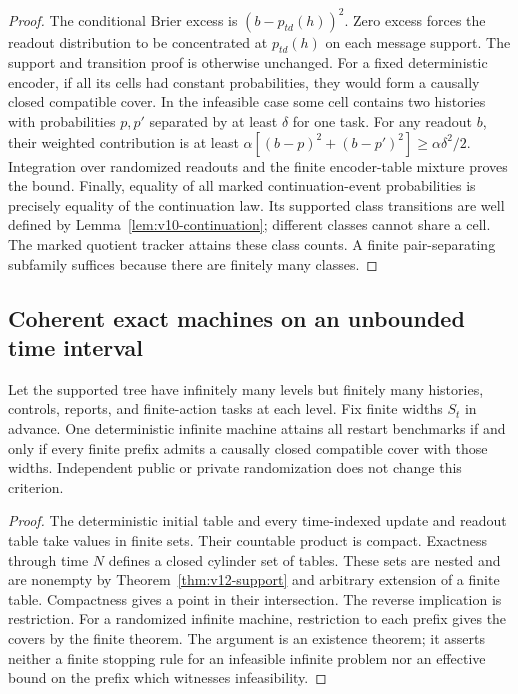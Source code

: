 \begin{proof}
The conditional Brier excess is $(b-p_{td}(h))^2$. Zero excess forces the
readout distribution to be concentrated at $p_{td}(h)$ on each message
support. The support and transition proof is otherwise unchanged. For a
fixed deterministic encoder, if all its cells had constant probabilities,
they would form a causally closed compatible cover. In the infeasible
case some cell contains two histories with probabilities $p,p'$ separated
by at least $\delta$ for one task. For any readout $b$, their weighted
contribution is at least
$\alpha[(b-p)^2+(b-p')^2]\ge\alpha\delta^2/2$.
Integration over randomized readouts and the finite encoder-table mixture
proves the bound. Finally, equality of all marked continuation-event
probabilities is precisely equality of the continuation law. Its
supported class transitions are well defined by
Lemma~\ref{lem:v10-continuation}; different classes cannot share a cell.
The marked quotient tracker attains these class counts. A finite
pair-separating subfamily suffices because there are finitely many classes.
\end{proof}

\subsection{Coherent exact machines on an unbounded time interval}
\begin{corollary}
\label{cor:v12-prefix}
Let the supported tree have infinitely many levels but finitely many
histories, controls, reports, and finite-action tasks at each level.
Fix finite widths $S_t$ in advance. One deterministic infinite machine
attains all restart benchmarks if and only if every finite prefix admits
a causally closed compatible cover with those widths. Independent public
or private randomization does not change this criterion.
\end{corollary}

\begin{proof}
The deterministic initial table and every time-indexed update and readout
table take values in finite sets. Their countable product is compact.
Exactness through time $N$ defines a closed cylinder set of tables. These
sets are nested and are nonempty by Theorem~\ref{thm:v12-support} and
arbitrary extension of a finite table. Compactness gives a point in their
intersection. The reverse implication is restriction. For a randomized
infinite machine, restriction to each prefix gives the covers by the
finite theorem. The argument is an existence theorem; it asserts neither
a finite stopping rule for an infeasible infinite problem nor an effective
bound on the prefix which witnesses infeasibility.
\end{proof}
